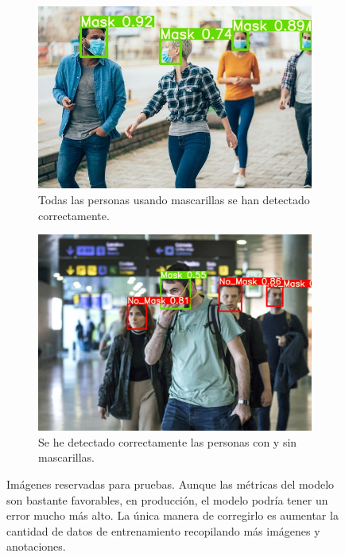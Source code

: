 \begin{figure}[htb]
\medskip
\begin{subfigure}{0.45\textwidth}
  \includegraphics[width=\linewidth]{images/covid_test6.jpg}
  \caption{Todas las personas usando mascarillas se han detectado correctamente.}
  \label{fig:4}
\end{subfigure}\hfil %
\begin{subfigure}{0.45\textwidth}
  \includegraphics[width=\linewidth]{images/covid_test8.jpg}
  \caption{Se he detectado correctamente las personas con y sin mascarillas.}
  \label{fig:5}
\end{subfigure}\hfil %
\caption[Imágenes de pruebas]{Imágenes reservadas para pruebas. Aunque las métricas del modelo son bastante favorables, en producción, el modelo podría tener un error mucho más alto. La única manera de corregirlo es aumentar la cantidad de datos de entrenamiento recopilando más imágenes y anotaciones.}
\label{fig:yolotests}
\end{figure}